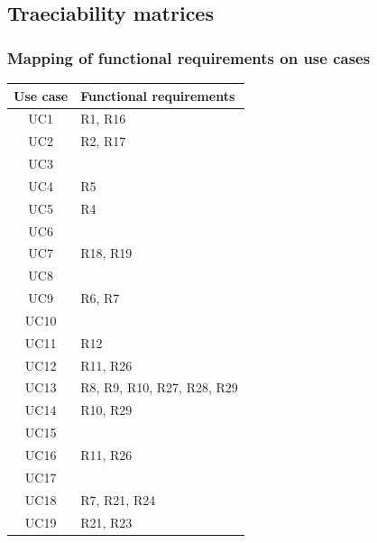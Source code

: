 \subsection{Traeciability matrices}

\subsubsection*{Mapping of functional requirements on use cases}
\begin{center}
    \def\arraystretch{1.5}
    \begin{longtable}[H]{|c|l|}
        \hline
        \textbf{Use case} & \textbf{Functional requirements} \\ \hline
        UC1               & R1, R16                          \\ \hline
        UC2               & R2, R17                          \\ \hline
        UC3               &                                  \\ \hline
        UC4               & R5                               \\ \hline
        UC5               & R4                               \\ \hline
        UC6               &                                  \\ \hline
        UC7               & R18, R19                         \\ \hline
        UC8               &                                  \\ \hline
        UC9               & R6, R7                           \\ \hline
        UC10              &                                  \\ \hline
        UC11              & R12                              \\ \hline
        UC12              & R11, R26                         \\ \hline
        UC13              & R8, R9, R10, R27, R28, R29       \\ \hline
        UC14              & R10, R29                         \\ \hline
        UC15              &                                  \\ \hline
        UC16              & R11, R26                         \\ \hline
        UC17              &                                  \\ \hline
        UC18              & R7, R21, R24                     \\ \hline
        UC19              & R21, R23                         \\ \hline
    \end{longtable}
\end{center}


